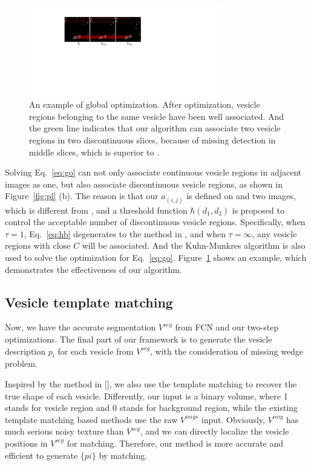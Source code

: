 \begin{figure}
    \begin{center}
        \includegraphics[width=3.3in]{figs/fig_go.pdf}
    \end{center}
    \caption{An example of global optimization. After optimization, vesicle regions belonging to the same vesicle have been well associated. And the green line indicates that our algorithm can associate two vesicle regions in two discontinuous slices, because of missing detection in middle slices, which is superior to \cite{Xu2016}.}
    \label{fig:go}
\end{figure}

Solving Eq.~\ref{eq:go} can not only associate continuous vesicle regions in adjacent images as one, but also associate discontinuous vesicle regions, as shown in Figure~\ref{fig:pl} (b).
The reason is that our $a_(i,j)$ is defined on and two images, which is different from \cite{Xu2016}, and a threshold function $\hbar(d_1,d_2)$ is proposed to control the acceptable number of discontinuous vesicle regions.
Specifically, when $\tau=1$, Eq.~\ref{eq:hb} degenerates to the method in \cite{Xu2016}, and when $\tau=\infty$, any vesicle regions with close $C$ will be associated.
And the Kuhn-Munkres algorithm \cite{Kuhn1955} is also used to solve the optimization for Eq.~\ref{eq:go}. 
Figure~\ref{fig:go} shows an example, which demonstrates the effectiveness of our algorithm.

\subsection{Vesicle template matching}
Now, we have the accurate segmentation $V^{seg}$ from FCN and our two-step optimizations.
The final part of our framework is to generate the vesicle description $p_i$ for each vesicle from $V^{seg}$, with the consideration of missing wedge problem.

Inspired by the method in [], we also use the template matching to recover the true shape of each vesicle.
Differently, our input is a binary volume, where 1 stands for vesicle region and 0 stands for background region, while the existing template matching based methods use the raw $V^{imgs}$ input.
Obviously, $V^{img}$ has much serious noisy texture than $V^{seg}$, and we can directly localize the vesicle positions in $V^{seg}$ for matching.
Therefore, our method is more accurate and efficient to generate $\{pi\}$ by matching.
 
